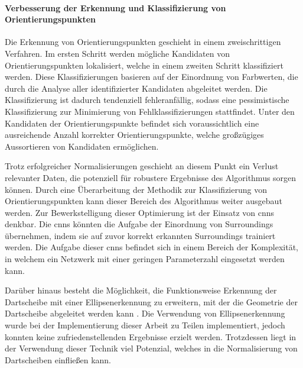 \paragraph{Verbesserung der Erkennung und Klassifizierung von Orientierungspunkten}

Die Erkennung von Orientierungspunkten geschieht in einem zweischrittigen Verfahren. Im ersten Schritt werden mögliche Kandidaten von Orientierungspunkten lokalisiert, welche in einem zweiten Schritt klassifiziert werden. Diese Klassifizierungen basieren auf der Einordnung von Farbwerten, die durch die Analyse aller identifizierter Kandidaten abgeleitet werden. Die Klassifizierung ist dadurch tendenziell fehleranfällig, sodass eine pessimistische Klassifizierung zur Minimierung von Fehlklassifizierungen stattfindet. Unter den Kandidaten der Orientierungspunkte befindet sich voraussichtlich eine ausreichende Anzahl korrekter Orientierungspunkte, welche großzügiges Aussortieren von Kandidaten ermöglichen.

Trotz erfolgreicher Normalisierungen geschieht an diesem Punkt ein Verlust relevanter Daten, die potenziell für robustere Ergebnisse des Algorithmus sorgen können. Durch eine Überarbeitung der Methodik zur Klassifizierung von Orientierungspunkten kann dieser Bereich des Algorithmus weiter ausgebaut werden. Zur Bewerkstelligung dieser Optimierung ist der Einsatz von \acp{cnn} denkbar. Die \acp{cnn} könnten die Aufgabe der Einordnung von Surroundings übernehmen, indem sie auf zuvor korrekt erkannten Surroundings trainiert werden. Die Aufgabe dieser \acp{cnn} befindet sich in einem Bereich der Komplexität, in welchem ein Netzwerk mit einer geringen Parameterzahl eingesetzt werden kann.


Darüber hinaus besteht die Möglichkeit, die Funktionsweise Erkennung der Dartscheibe mit einer Ellipsenerkennung zu erweitern, mit der die Geometrie der Dartscheibe abgeleitet werden kann \cite{ellipse_detection_algorithm}. Die Verwendung von Ellipsenerkennung wurde bei der Implementierung dieser Arbeit zu Teilen implementiert, jedoch konnten keine zufriedenstellenden Ergebnisse erzielt werden. Trotzdessen liegt in der Verwendung dieser Technik viel Potenzial, welches in die Normalisierung von Dartscheiben einfließen kann.

